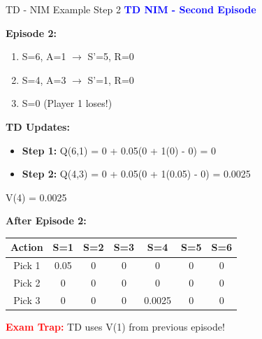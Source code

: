 \documentclass[8pt]{beamer}
\begin{document}
	\begin{frame}{TD - NIM Example Step 2}
		\fontsize{6.5}{7.5}\selectfont
		\textcolor{blue}{\textbf{TD NIM - Second Episode}}
		
		\textbf{Episode 2:}
		\begin{enumerate}
			\item S=6, A=1 $\rightarrow$ S'=5, R=0
			\item S=4, A=3 $\rightarrow$ S'=1, R=0
			\item S=0 (Player 1 loses!)
		\end{enumerate}
		
		\textbf{TD Updates:}
		\begin{itemize}
			\item \textbf{Step 1:} Q(6,1) = 0 + 0.05(0 + 1(0) - 0) = 0
			\item \textbf{Step 2:} Q(4,3) = 0 + 0.05(0 + 1(0.05) - 0) = 0.0025
		\end{itemize}
		V(4) = 0.0025
		
		\textbf{After Episode 2:}
		\begin{tabular}{|c|c|c|c|c|c|c|}
			\hline
			Action & S=1 & S=2 & S=3 & S=4 & S=5 & S=6 \\
			\hline
			Pick 1 & 0.05 & 0 & 0 & 0 & 0 & 0 \\
			\hline
			Pick 2 & 0 & 0 & 0 & 0 & 0 & 0 \\
			\hline
			Pick 3 & 0 & 0 & 0 & 0.0025 & 0 & 0 \\
			\hline
		\end{tabular}
		
		\textcolor{red}{\textbf{Exam Trap:}} TD uses V(1) from previous episode!
	\end{frame}
	
\end{document}
